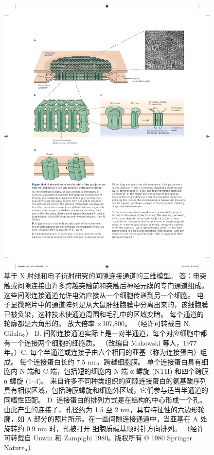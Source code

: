 \begin{figure}[htbp]
	\centering
	\includegraphics[width=0.9\linewidth]{chap11/fig_11_4}
	\caption{基于 X 射线和电子衍射研究的间隙连接通道的三维模型。 答：电突触或间隙连接由许多跨越突触前和突触后神经元膜的专门通道组成。 这些间隙连接通道允许电流直接从一个细胞传递到另一个细胞。 电子显微照片中的通道阵列是从大鼠肝细胞膜中分离出来的，该细胞膜已被负染，这种技术使通道周围和毛孔中的区域变暗。 每个通道的轮廓都是六角形的。 放大倍率 ×307,800。 （经许可转载自 N. Gilula。） B. 间隙连接通道实际上是一对半通道，每个对应细胞中都有一个连接两个细胞的细胞质。 （改编自 Makowski 等人，1977 年。）C. 每个半通道或连接子由六个相同的亚基（称为连接蛋白）组成。 每个连接蛋白长约 7.5 nm，跨越细胞膜。 单个连接蛋白具有细胞内 N 端和 C 端，包括短的细胞内 N 端 α 螺旋 (NTH) 和四个跨膜 α 螺旋 (1–4)。 来自许多不同种类组织的间隙连接蛋白的氨基酸序列具有相似区域，包括跨膜螺旋和细胞外区域，它们参与适当半通道的同嗜性匹配。 D. 连接蛋白的排列方式是在结构的中心形成一个孔。 由此产生的连接子，孔径约为 1.5 至 2 nm，具有特征性的六边形轮廓，如 A 部分的照片所示。在一些间隙连接通道中，当亚基在 A 处旋转约 0.9 nm 时，孔被打开 细胞质碱基顺时针方向排列。 （经许可转载自 Unwin 和 Zampighi 1980。版权所有 © 1980 Springer Nature。）}
	\label{fig:11_4}
\end{figure}



